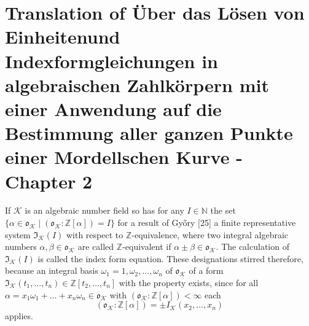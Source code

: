 \documentclass[11pt,a4paper]{article}
\newcommand{\oK}{\mathfrak{o}_\mathcal{K}}
\begin{document}
\section*{Translation of \"{U}ber das L\"{o}sen von Einheitenund
Indexformgleichungen in algebraischen
Zahlk\"{o}rpern mit einer Anwendung auf die
Bestimmung aller ganzen Punkte einer
Mordellschen Kurve - Chapter 2
}
If $\mathcal{K}$ is an algebraic number field so has for any $I \in\mathbb{N}$ the set $\{\alpha\in\oK\mid ( \oK: \mathbb{Z}[\alpha]) = I\}$ for a result of Gy\H{o}ry [25] a finite representative system $\mathfrak{I}_\mathcal{K}(I)$ with respect to $\mathbb{Z}$-equivalence, where two integral algebraic numbers $\alpha,\beta\in \oK$ are called $\mathbb{Z}$-equivalent if $\alpha\pm\beta\in\oK$.
The calculation of $\mathfrak{I}_\mathcal{K}(I)$ is called the index form equation.
These designations stirred therefore, because an integral basis $\omega_1 = 1,\omega_2,\ldots,\omega_n$ of $\oK$ of a form $\mathfrak{I}_\mathcal{K}(t_1,\ldots,t_n) \in \mathbb{Z}[t_2,\ldots,t_n]$ with the property exists, since for all $\alpha = x_1\omega_1 +\ldots + x_n\omega_n \in \oK$ with $( \oK : \mathbb{Z}[\alpha]) <\infty$ each 
\[( \oK : \mathbb{Z}[\alpha]) = \pm I_\mathcal{K}(x_2,\ldots, x_n)\]
applies.
\end{document}
